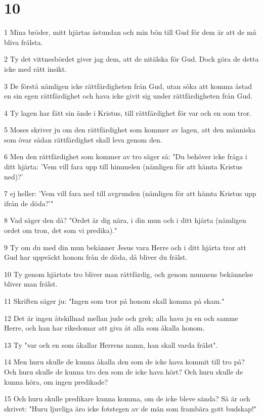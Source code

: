 \chapter{10}

\par 1 Mina bröder, mitt hjärtas åstundan och min bön till Gud för dem är att de må bliva frälsta.
\par 2 Ty det vittnesbördet giver jag dem, att de nitälska för Gud. Dock göra de detta icke med rätt insikt.
\par 3 De förstå nämligen icke rättfärdigheten från Gud, utan söka att komma åstad en sin egen rättfärdighet och hava icke givit sig under rättfärdigheten från Gud.
\par 4 Ty lagen har fått sin ände i Kristus, till rättfärdighet för var och en som tror.
\par 5 Moses skriver ju om den rättfärdighet som kommer av lagen, att den människa som övar sådan rättfärdighet skall leva genom den.
\par 6 Men den rättfärdighet som kommer av tro säger så: "Du behöver icke fråga i ditt hjärta: 'Vem vill fara upp till himmelen (nämligen för att hämta Kristus ned)?'
\par 7 ej heller: 'Vem vill fara ned till avgrunden (nämligen för att hämta Kristus upp ifrån de döda?'"
\par 8 Vad säger den då? "Ordet är dig nära, i din mun och i ditt hjärta (nämligen ordet om tron, det som vi predika)."
\par 9 Ty om du med din mun bekänner Jesus vara Herre och i ditt hjärta tror att Gud har uppväckt honom från de döda, då bliver du frälst.
\par 10 Ty genom hjärtats tro bliver man rättfärdig, och genom munnens bekännelse bliver man frälst.
\par 11 Skriften säger ju: "Ingen som tror på honom skall komma på skam."
\par 12 Det är ingen åtskillnad mellan jude och grek; alla hava ju en och samme Herre, och han har rikedomar att giva åt alla som åkalla honom.
\par 13 Ty "var och en som åkallar Herrens namn, han skall varda frälst".
\par 14 Men huru skulle de kunna åkalla den som de icke hava kommit till tro på? Och huru skulle de kunna tro den som de icke hava hört? Och huru skulle de kunna höra, om ingen predikade?
\par 15 Och huru skulle predikare kunna komma, om de icke bleve sända? Så är och skrivet: "Huru ljuvliga äro icke fotstegen av de män som frambära gott budskap!"

